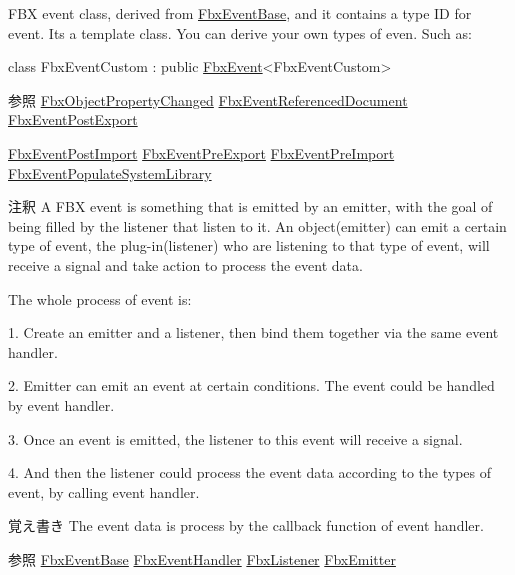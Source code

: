 F\+BX event class, derived from \hyperlink{class_fbx_event_base}{Fbx\+Event\+Base}, and it contains a type ID for event. It\textquotesingle{}s a template class. You can derive your own types of even. Such as\+: 
\begin{DoxyCode}
\textcolor{keyword}{class }FbxEventCustom : \textcolor{keyword}{public} \hyperlink{class_fbx_event}{FbxEvent}<FbxEventCustom> 
\end{DoxyCode}
 \begin{DoxySeeAlso}{参照}
\hyperlink{class_fbx_object_property_changed}{Fbx\+Object\+Property\+Changed} \hyperlink{class_fbx_event_referenced_document}{Fbx\+Event\+Referenced\+Document} \hyperlink{class_fbx_event_post_export}{Fbx\+Event\+Post\+Export} 

\hyperlink{class_fbx_event_post_import}{Fbx\+Event\+Post\+Import} \hyperlink{class_fbx_event_pre_export}{Fbx\+Event\+Pre\+Export} \hyperlink{class_fbx_event_pre_import}{Fbx\+Event\+Pre\+Import} \hyperlink{class_fbx_event_populate_system_library}{Fbx\+Event\+Populate\+System\+Library}
\end{DoxySeeAlso}
\begin{DoxyRemark}{注釈}
A F\+BX event is something that is emitted by an emitter, with the goal of being filled by the listener that listen to it. An object(emitter) can emit a certain type of event, the plug-\/in(listener) who are listening to that type of event, will receive a signal and take action to process the event data. 
\end{DoxyRemark}
\begin{DoxyParagraph}{The whole process of event is\+:}
\begin{DoxyItemize}
\item 1. Create an emitter and a listener, then bind them together via the same event handler. \item 2. Emitter can emit an event at certain conditions. The event could be handled by event handler. \item 3. Once an event is emitted, the listener to this event will receive a signal. \item 4. And then the listener could process the event data according to the types of event, by calling event handler. \end{DoxyItemize}

\end{DoxyParagraph}
\begin{DoxyNote}{覚え書き}
The event data is process by the callback function of event handler. 
\end{DoxyNote}
\begin{DoxySeeAlso}{参照}
\hyperlink{class_fbx_event_base}{Fbx\+Event\+Base} \hyperlink{class_fbx_event_handler}{Fbx\+Event\+Handler} \hyperlink{class_fbx_listener}{Fbx\+Listener} \hyperlink{class_fbx_emitter}{Fbx\+Emitter} 
\end{DoxySeeAlso}


